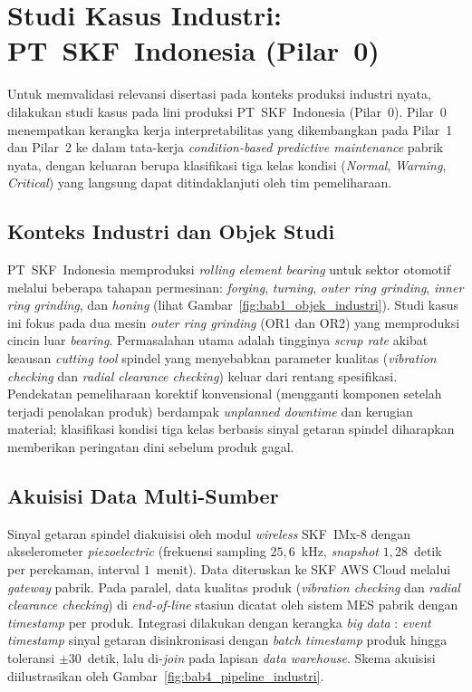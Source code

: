 \section{Studi Kasus Industri: PT~SKF~Indonesia (Pilar~0)}
\label{sec:bab4_studi_kasus_industri}

Untuk memvalidasi relevansi disertasi pada konteks produksi industri
nyata, dilakukan studi kasus pada lini produksi PT~SKF~Indonesia
(Pilar~0). Pilar~0 menempatkan kerangka kerja interpretabilitas yang
dikembangkan pada Pilar~1 dan Pilar~2 ke dalam tata-kerja
\emph{condition-based predictive maintenance} pabrik nyata, dengan
keluaran berupa klasifikasi tiga kelas kondisi (\emph{Normal},
\emph{Warning}, \emph{Critical}) yang langsung dapat ditindaklanjuti
oleh tim pemeliharaan.

\subsection{Konteks Industri dan Objek Studi}
\label{subsec:bab4_industri_konteks}

PT~SKF~Indonesia memproduksi \emph{rolling element bearing} untuk sektor otomotif
melalui beberapa tahapan permesinan: \emph{forging}, \emph{turning},
\emph{outer ring grinding}, \emph{inner ring grinding}, dan
\emph{honing} (lihat Gambar~\ref{fig:bab1_objek_industri}). Studi kasus
ini fokus pada dua mesin \emph{outer ring grinding} (OR1 dan OR2)
yang memproduksi cincin luar \emph{bearing}. Permasalahan utama adalah
tingginya \emph{scrap rate} akibat keausan \emph{cutting tool}
spindel yang menyebabkan parameter kualitas (\emph{vibration checking}
dan \emph{radial clearance checking}) keluar dari rentang spesifikasi.
Pendekatan pemeliharaan korektif konvensional (mengganti komponen
setelah terjadi penolakan produk) berdampak \emph{unplanned downtime}
dan kerugian material; klasifikasi kondisi tiga kelas berbasis sinyal
getaran spindel diharapkan memberikan peringatan dini sebelum produk
gagal.

\subsection{Akuisisi Data Multi-Sumber}
\label{subsec:bab4_akuisisi_data}

Sinyal getaran spindel diakuisisi oleh modul \emph{wireless} SKF~IMx-8
dengan akselerometer \emph{piezoelectric} (frekuensi sampling
$25{,}6$~kHz, \emph{snapshot} $1{,}28$~detik per perekaman, interval
$1$~menit). Data diteruskan ke SKF AWS Cloud melalui
\emph{gateway} pabrik. Pada paralel, data kualitas produk
(\emph{vibration checking} dan \emph{radial clearance checking}) di
\emph{end-of-line} stasiun dicatat oleh sistem MES pabrik dengan
\emph{timestamp} per produk. Integrasi dilakukan dengan kerangka
\emph{big data} : \emph{event timestamp}
sinyal getaran disinkronisasi dengan \emph{batch timestamp} produk
hingga toleransi $\pm 30$~detik, lalu di-\emph{join} pada lapisan
\emph{data warehouse}. Skema akuisisi diilustrasikan oleh
Gambar~\ref{fig:bab4_pipeline_industri}.

